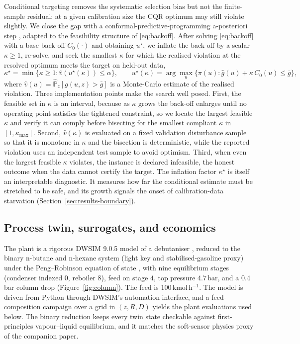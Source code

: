 \documentclass[review,times]{elsarticle}
\begin{document}
Conditional targeting removes the systematic selection bias but not the finite-sample
residual: at a given calibration size the CQR optimum may still violate slightly. We close
the gap with a conformal-predictive-programming a-posteriori step \citep{zhao2024cpp},
adapted to the feasibility structure of \eqref{eq:backoff}. After solving
\eqref{eq:backoff} with a base back-off $C_0(\cdot)$ and obtaining $u^\star$, we inflate the
back-off by a scalar $\kappa\ge 1$, re-solve, and seek the smallest $\kappa$ for which the
realised violation at the resolved optimum meets the target on held-out data,
\begin{equation*}
\kappa^\star=\min\big\{\kappa\ge 1 : \hat v(u^\star(\kappa))\le\alpha\big\},
\qquad u^\star(\kappa)=\arg\max_{u}\big\{\pi(u):\hat g(u)+\kappa\,C_0(u)\le\bar g\big\},
\end{equation*}
where $\hat v(u)=\widehat{\mathbb{P}}_z[g(u,z)>\bar g]$ is a Monte-Carlo estimate of the
realised violation. Three implementation points make the search well posed. First, the
feasible set in $\kappa$ is an interval, because as $\kappa$ grows the back-off enlarges
until no operating point satisfies the tightened constraint, so we locate the largest
feasible $\kappa$ and verify it can comply before bisecting for the smallest compliant
$\kappa$ in $[1,\kappa_{\max}]$. Second, $\hat v(\kappa)$ is evaluated on a fixed validation
disturbance sample so that it is monotone in $\kappa$ and the bisection is deterministic,
while the reported violation uses an independent test sample to avoid optimism. Third, when
even the largest feasible $\kappa$ violates, the instance is declared infeasible, the honest
outcome when the data cannot certify the target. The inflation factor $\kappa^\star$ is
itself an interpretable diagnostic. It measures how far the conditional estimate must be
stretched to be safe, and its growth signals the onset of calibration-data starvation
(Section~\ref{sec:results-boundary}).

\subsection{Process twin, surrogates, and economics}
\label{sec:methods-twin}

The plant is a rigorous DWSIM 9.0.5 model of a debutaniser \citep{dwsim}, reduced to the
binary n-butane and n-hexane system (light key and stabilised-gasoline proxy) under the
Peng--Robinson equation of state \citep{peng1976}, with nine equilibrium stages (condenser
indexed $0$, reboiler $8$), feed on stage $4$, top pressure $4.7$\,bar, and a $0.4$\,bar
column drop (Figure~\ref{fig:column}). The feed is $100$\,kmol\,h$^{-1}$. The model is driven
from Python through DWSIM's automation interface, and a feed-composition campaign over a grid
in $(z,R,D)$ yields the plant evaluations used below. The binary reduction keeps every twin
state checkable against first-principles vapour--liquid equilibrium, and it matches the
soft-sensor physics proxy of the companion paper.
\end{document}
